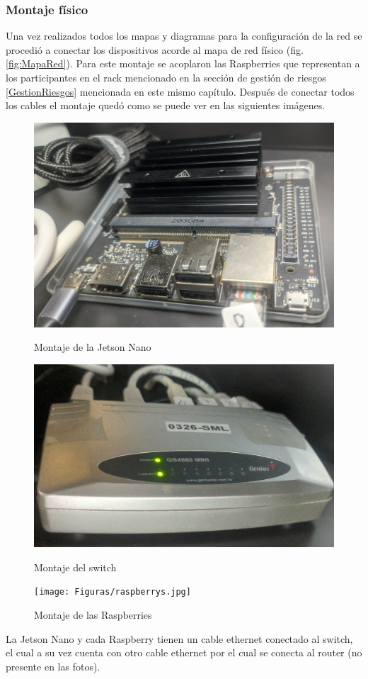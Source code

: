 \subsubsection{Montaje físico}
Una vez realizados todos los mapas y diagramas para la configuración de la red se procedió a conectar los dispositivos acorde al mapa de red físico (fig. \ref{fig:MapaRed}). Para este montaje se acoplaron las Raspberries que representan a los participantes en el rack mencionado en la sección de gestión de riesgos \ref{GestionRiesgos} mencionada en este mismo capítulo. Después de conectar todos los cables el montaje quedó como se puede ver en las siguientes imágenes.
\begin{figure}[H]
    \centering
    \begin{minipage}[t]{0.49\linewidth}  %
        \includegraphics[height=0.2\textheight]{Figuras/jetsonnano.jpg}
        \caption{Montaje de la Jetson Nano} 
    \end{minipage}
    \hfill
    \begin{minipage}[t]{0.5\linewidth}  %
        \includegraphics[height=0.2\textheight]{Figuras/switch.jpg}
        \caption{Montaje del switch} 
    \end{minipage}

    \texttt{[image: Figuras/raspberrys.jpg]}
    \caption{Montaje de las Raspberries}     
\end{figure}

La Jetson Nano y cada Raspberry tienen un cable ethernet conectado al switch, el cual a su vez cuenta con otro cable ethernet por el cual se conecta al router (no presente en las fotos).
